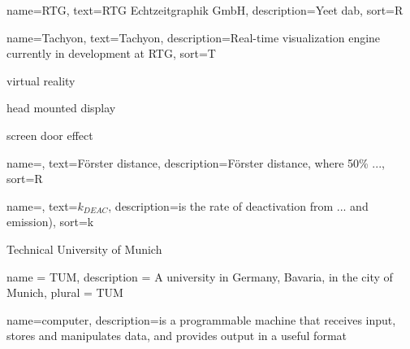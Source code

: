 
{
  name=RTG,
  text=RTG Echtzeitgraphik GmbH,
  description={Yeet dab}, 
  sort=R
}

{
  name=Tachyon,
  text=Tachyon,
  description={Real-time visualization engine currently in development at \gls{RTG}}, 
  sort=T
}

{virtual reality}

{head mounted display}

{screen door effect}







{
  name=,
  text=F\"{o}rster distance,
  description={F\"{o}rster distance, where 50\% ...}, 
  sort=R
}

{
  name=,
  text=$k_{DEAC}$, 
  description={is the rate of deactivation from ... and emission)}, 
  sort=k
}

{Technical University of Munich}

{
  name = TUM,
  description = {A university in Germany, Bavaria, in the city of Munich},
  plural = TUM
}

{
  name=computer,
  description={is a programmable machine that receives input,
               stores and manipulates data, and provides
               output in a useful format}
}